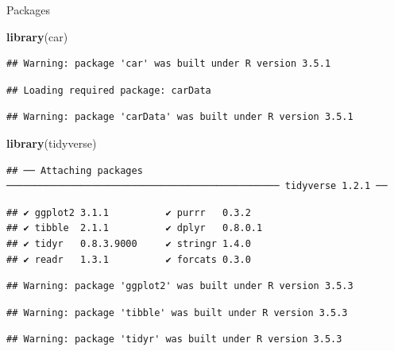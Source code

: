 \documentclass[ignorenonframetext,]{beamer}
\newenvironment{Shaded}{\begin{snugshade}}{\end{snugshade}}
\newcommand{\KeywordTok}[1]{\textcolor[rgb]{0.13,0.29,0.53}{\textbf{#1}}}
\newcommand{\NormalTok}[1]{#1}
\begin{document}
\begin{frame}[fragile]{Packages}
\protect\hypertarget{packages-5}{}

\begin{Shaded}
\begin{Highlighting}[]
\KeywordTok{library}\NormalTok{(car)}
\end{Highlighting}
\end{Shaded}

\begin{verbatim}
## Warning: package 'car' was built under R version 3.5.1
\end{verbatim}

\begin{verbatim}
## Loading required package: carData
\end{verbatim}

\begin{verbatim}
## Warning: package 'carData' was built under R version 3.5.1
\end{verbatim}

\begin{Shaded}
\begin{Highlighting}[]
\KeywordTok{library}\NormalTok{(tidyverse)}
\end{Highlighting}
\end{Shaded}

\begin{verbatim}
## ── Attaching packages ──────────────────────────────────────────────── tidyverse 1.2.1 ──
\end{verbatim}

\begin{verbatim}
## ✔ ggplot2 3.1.1          ✔ purrr   0.3.2     
## ✔ tibble  2.1.1          ✔ dplyr   0.8.0.1   
## ✔ tidyr   0.8.3.9000     ✔ stringr 1.4.0     
## ✔ readr   1.3.1          ✔ forcats 0.3.0
\end{verbatim}

\begin{verbatim}
## Warning: package 'ggplot2' was built under R version 3.5.3
\end{verbatim}

\begin{verbatim}
## Warning: package 'tibble' was built under R version 3.5.3
\end{verbatim}

\begin{verbatim}
## Warning: package 'tidyr' was built under R version 3.5.3
\end{verbatim}


\end{frame}
\end{document}
